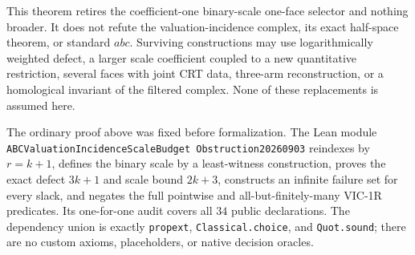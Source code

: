 This theorem retires the coefficient-one binary-scale one-face selector and
nothing broader.  It does not refute the valuation-incidence complex, its
exact half-space theorem, or standard $abc$.  Surviving constructions may use
logarithmically weighted defect, a larger scale coefficient coupled to a new
quantitative restriction, several faces with joint CRT data, three-arm
reconstruction, or a homological invariant of the filtered complex.  None of
these replacements is assumed here.

The ordinary proof above was fixed before formalization.  The Lean module
\texttt{ABCValuation\allowbreak Incidence\allowbreak ScaleBudget\allowbreak
Obstruction20260903}
reindexes by
$r=k+1$, defines the binary scale by a least-witness construction, proves the
exact defect $3k+1$ and scale bound $2k+3$, constructs an infinite failure set
for every slack, and negates the full pointwise and all-but-finitely-many
VIC-1R predicates.  Its one-for-one audit covers all $34$ public declarations.
The dependency union is exactly \texttt{propext},
\texttt{Classical.choice}, and \texttt{Quot.sound}; there are no custom
axioms, placeholders, or native decision oracles.
